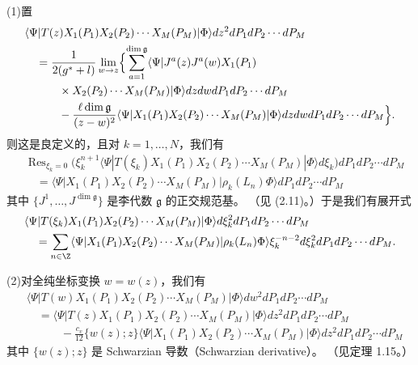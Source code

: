\begin{theorem}[3.26]
(1)\quad 置
\[
  \begin{aligned}
  &\langle\Psi|T(z)X_1(P_1)X_2(P_2)\cdots X_M(P_M)|\Phi\rangle
   dz^2dP_1dP_2\cdots dP_M\\
  &\quad = \frac{1}{2(g^*+l)}\lim_{w\to z}\Bigl\{
    \sum_{a=1}^{\dim\mathfrak{g}}
    \langle\Psi|J^a(z)J^a(w)X_1(P_1)\\
  &\quad\qquad \times X_2(P_2)\cdots X_M(P_M)|\Phi\rangle
    dzdwdP_1dP_2\cdots dP_M\\
  &\quad\qquad -\frac{\ell\dim\mathfrak{g}}{(z-w)^2}
    \langle\Psi|X_1(P_1)X_2(P_2)\cdots X_M(P_M)|\Phi\rangle
    dzdwdP_1dP_2\cdots dP_M\Bigr\}.
  \end{aligned}
\]
则这是良定义的，且对 $k=1,\dots,N$，我们有
\[
  \begin{aligned}
  &\operatorname{Res}_{\xi_k=0}\bigl(\xi_k^{n+1}
   \langle\Psi|T(\xi_k)X_1(P_1)X_2(P_2)\cdots X_M(P_M)|\Phi\rangle
   d\xi_k\bigr)dP_1dP_2\cdots dP_M\\
  &\quad = \langle\Psi|X_1(P_1)X_2(P_2)\cdots X_M(P_M)|\rho_k(L_n)\Phi\rangle
   dP_1dP_2\cdots dP_M
  \end{aligned}
\]
其中 $\{J^1,\dots,J^{\dim\mathfrak{g}}\}$ 是李代数 $\mathfrak{g}$ 的正交规范基。
（见 (2.11)。）于是我们有展开式
\[
  \begin{aligned}
  &\langle\Psi|T(\xi_k)X_1(P_1)X_2(P_2)\cdots X_M(P_M)|\Phi\rangle
   d\xi_k^2 dP_1dP_2\cdots dP_M\\
  &\quad = \sum_{n\in\Z}\langle\Psi|X_1(P_1)X_2(P_2)\cdots X_M(P_M)
   |\rho_k(L_n)\Phi\rangle\xi_k^{-n-2}
   d\xi_k^2 dP_1dP_2\cdots dP_M .
  \end{aligned}
\]

(2)\quad 对全纯坐标变换 $w=w(z)$，我们有
\[
  \begin{aligned}
  &\langle\Psi|T(w)X_1(P_1)X_2(P_2)\cdots X_M(P_M)|\Phi\rangle
   dw^2dP_1dP_2\cdots dP_M\\
  &\quad = \langle\Psi|T(z)X_1(P_1)X_2(P_2)\cdots X_M(P_M)|\Phi\rangle
   dz^2dP_1dP_2\cdots dP_M\\
  &\quad\qquad -\frac{c_v}{12}\{w(z);z\}
   \langle\Psi|X_1(P_1)X_2(P_2)\cdots X_M(P_M)|\Phi\rangle
   dz^2dP_1dP_2\cdots dP_M
  \end{aligned}
\]
其中 $\{w(z);z\}$ 是 Schwarzian 导数（Schwarzian derivative）。
（见定理 1.15。）
\end{theorem}
